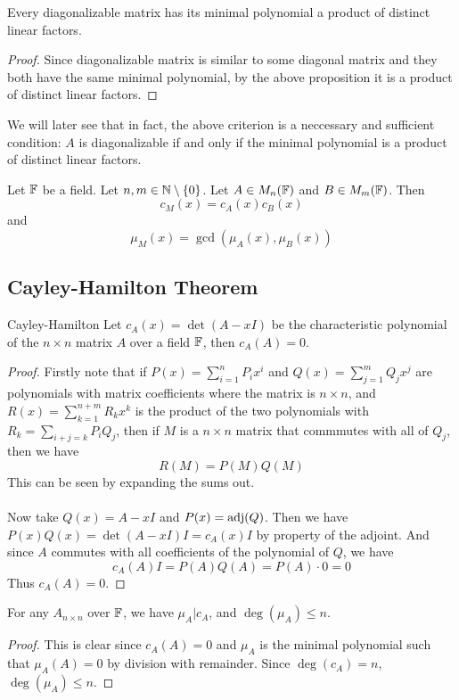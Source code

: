 \documentclass[a4paper]{article}
\begin{document}
\begin{crl}{}{} Every diagonalizable matrix has its minimal polynomial a product of distinct linear factors. \tcbline
\begin{proof} Since diagonalizable matrix is similar to some diagonal matrix and they both have the same minimal polynomial, by the above proposition it is a product of distinct linear factors. 
\end{proof}
\end{crl}

We will later see that in fact, the above criterion is a neccessary and sufficient condition: $A$ is diagonalizable if and only if the minimal polynomial is a product of distinct linear factors. 

\begin{lmm}{}{} Let $\mathbb{F}$ be a field. Let $n,m\in\mathbb{N}\setminus\{0\}$. Let $A\in M_n(\mathbb{F})$ and $B\in M_m(\mathbb{F})$. Then $$c_M(x)=c_A(x)c_B(x)$$ and $$\mu_M(x)=\gcd(\mu_A(x),\mu_B(x))$$
\end{lmm}

\subsection{Cayley-Hamilton Theorem}
\begin{thm}{Cayley-Hamilton}{} Let $c_A(x)=\det(A-xI)$ be the characteristic polynomial of the $n\times n$ matrix $A$ over a field $\mathbb{F}$, then $c_A(A)=0$. \tcbline
\begin{proof} Firstly note that if $P(x)=\sum_{i=1}^nP_ix^i$ and $Q(x)=\sum_{j=1}^mQ_jx^j$ are polynomials with matrix coefficients where the matrix is $n\times n$, and $R(x)=\sum_{k=1}^{n+m}R_kx^k$ is the product of the two polynomials with $R_k=\sum_{i+j=k}P_iQ_j$, then if $M$ is a $n\times n$ matrix that commmutes with all of $Q_j$, then we have $$R(M)=P(M)Q(M)$$
This can be seen by expanding the sums out. \\~\\
Now take $Q(x)=A-xI$ and $P(x)=\operatorname{adj}(Q)$. Then we have $P(x)Q(x)=\det(A-xI)I=c_A(x)I$ by property of the adjoint. And since $A$ commutes with all coefficients of the polynomial of $Q$, we have $$c_A(A)I=P(A)Q(A)=P(A)\cdot 0=0$$ Thus $c_A(A)=0$. 
\end{proof}
\end{thm}

\begin{crl}{}{} For any $A_{n\times n}$ over $\mathbb{F}$, we have $\mu_A|c_A$, and $\deg(\mu_A)\leq n$. \tcbline
\begin{proof}
This is clear since $c_A(A)=0$ and $\mu_A$ is the minimal polynomial such that $\mu_A(A)=0$ by division with remainder. Since $\deg(c_A)=n$, $\deg(\mu_A)\leq n$. 
\end{proof}
\end{crl}
\end{document}
